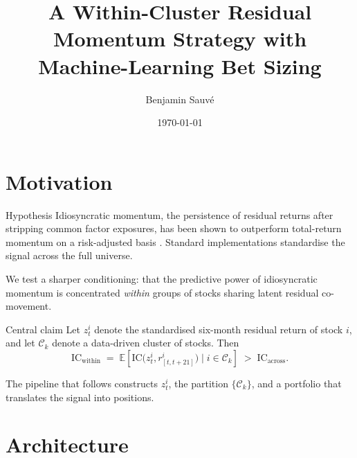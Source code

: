 \documentclass[10pt,aspectratio=169]{beamer}
\title[Within-Cluster Residual Momentum]{A Within-Cluster Residual Momentum Strategy with Machine-Learning Bet Sizing}
\author{Benjamin Sauv\'e}
\date{\today}
\begin{document}
\begin{frame}
  \titlepage
\end{frame}

\section{Motivation}

\begin{frame}{Hypothesis}
  \small
  Idiosyncratic momentum, the persistence of residual returns after stripping common factor exposures, has been shown to outperform total-return momentum on a risk-adjusted basis \cite{blitz2017}. Standard implementations standardise the signal across the full universe.

  \medskip

  We test a sharper conditioning: that the predictive power of idiosyncratic momentum is concentrated \emph{within} groups of stocks sharing latent residual co-movement.
  \begin{block}{Central claim}
    Let $z_t^i$ denote the standardised six-month residual return of stock $i$, and let $\mathcal{C}_k$ denote a data-driven cluster of stocks. Then
    \[
      \mathrm{IC}_{\text{within}} \;=\; \mathbb{E}\!\left[\mathrm{IC}\bigl(z_t^i, r_{[t,t+21]}^i\bigr) \mid i \in \mathcal{C}_k\right] \;>\; \mathrm{IC}_{\text{across}}.
    \]
  \end{block}

  The pipeline that follows constructs $z_t^i$, the partition $\{\mathcal{C}_k\}$, and a portfolio that translates the signal into positions.
\end{frame}

\section{Architecture}
\end{document}
